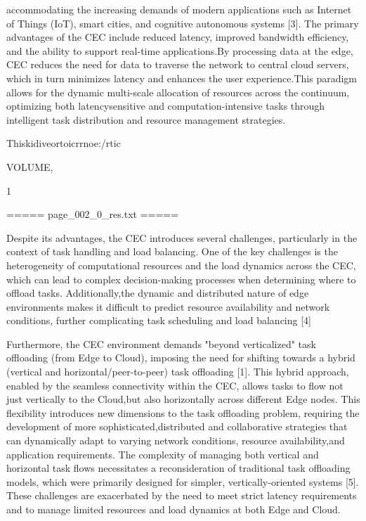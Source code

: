 \documentclass{article}
\begin{document}
accommodating the increasing demands of modern applications such as Internet of Things (IoT), smart cities, and cognitive autonomous systems [3]. The primary advantages of the CEC include reduced latency, improved bandwidth efficiency, and the ability to support real-time applications.By processing data at the edge, CEC reduces the need for data to traverse the network to central cloud servers, which in turn minimizes latency and enhances the user experience.This paradigm allows for the dynamic multi-scale allocation of resources across the continuum, optimizing both latencysensitive and computation-intensive tasks through intelligent task distribution and resource management strategies.

Thiskidiveortoicrrnoe:/rtic

VOLUME,

1

===== page\_002\_0\_res.txt =====


Despite its advantages, the CEC introduces several challenges, particularly in the context of task handling and load balancing. One of the key challenges is the heterogeneity of computational resources and the load dynamics across the CEC, which can lead to complex decision-making processes when determining where to offload tasks. Additionally,the dynamic and distributed nature of edge environments makes it difficult to predict resource availability and network conditions, further complicating task scheduling and load balancing [4]

Furthermore, the CEC environment demands "beyond verticalized" task offloading (from Edge to Cloud), imposing the need for shifting towards a hybrid (vertical and horizontal/peer-to-peer) task offloading [1]. This hybrid approach, enabled by the seamless connectivity within the CEC, allows tasks to flow not just vertically to the Cloud,but also horizontally across different Edge nodes. This flexibility introduces new dimensions to the task offloading problem, requiring the development of more sophisticated,distributed and collaborative strategies that can dynamically adapt to varying network conditions, resource availability,and application requirements. The complexity of managing both vertical and horizontal task flows necessitates a reconsideration of traditional task offloading models, which were primarily designed for simpler, vertically-oriented systems [5]. These challenges are exacerbated by the need to meet strict latency requirements and to manage limited resources and load dynamics at both Edge and Cloud.
\end{document}
